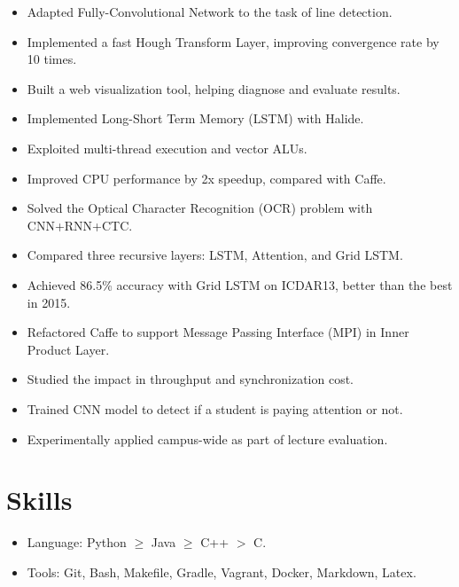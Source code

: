 \documentclass[letterpaper,11pt]{article}
\begin{document}
\begin{itemize}
  \begin{itemize}
  \item Adapted Fully-Convolutional Network to the task of line detection.
  \item Implemented a fast Hough Transform Layer, improving convergence rate by 10 times.
  \item Built a web visualization tool, helping diagnose and evaluate results.
  \end{itemize}
  \begin{itemize}
  \item Implemented Long-Short Term Memory (LSTM) with Halide.
  \item Exploited multi-thread execution and vector ALUs.
  \item Improved CPU performance by 2x speedup, compared with Caffe.  \end{itemize}
  \begin{itemize}
  \item Solved the Optical Character Recognition (OCR) problem with CNN+RNN+CTC.
  \item Compared three recursive layers: LSTM, Attention, and Grid LSTM.
  \item Achieved 86.5\% accuracy with Grid LSTM on ICDAR13, better than the best in 2015.
  \end{itemize}
  \begin{itemize}
  \item Refactored Caffe to support Message Passing Interface (MPI) in Inner Product Layer.
  \item Studied the impact in throughput and synchronization cost.
  \end{itemize}
  \begin{itemize}
  \item Trained CNN model to detect if a student is paying attention or not.
  \item Experimentally applied campus-wide as part of lecture evaluation.
  \end{itemize}
\end{itemize}

\section*{Skills}
\begin{itemize}
\item Language: Python $\ge$ Java $\ge$ C++ $>$ C.
\item Tools: Git, Bash, Makefile, Gradle, Vagrant, Docker, Markdown, Latex.
\end{itemize}
\end{document}
